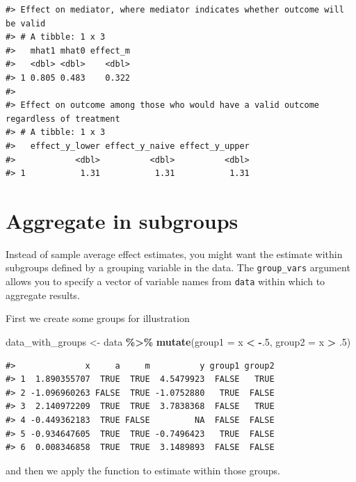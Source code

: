 \documentclass[
]{book}
\newenvironment{Shaded}{\begin{snugshade}}{\end{snugshade}}
\newcommand{\AttributeTok}[1]{\textcolor[rgb]{0.13,0.29,0.53}{#1}}
\newcommand{\DecValTok}[1]{\textcolor[rgb]{0.00,0.00,0.81}{#1}}
\newcommand{\FunctionTok}[1]{\textcolor[rgb]{0.13,0.29,0.53}{\textbf{#1}}}
\newcommand{\NormalTok}[1]{#1}
\newcommand{\OtherTok}[1]{\textcolor[rgb]{0.56,0.35,0.01}{#1}}
\newcommand{\SpecialCharTok}[1]{\textcolor[rgb]{0.81,0.36,0.00}{\textbf{#1}}}
\begin{document}
\begin{verbatim}
#> Effect on mediator, where mediator indicates whether outcome will be valid
#> # A tibble: 1 x 3
#>   mhat1 mhat0 effect_m
#>   <dbl> <dbl>    <dbl>
#> 1 0.805 0.483    0.322
#> 
#> Effect on outcome among those who would have a valid outcome regardless of treatment
#> # A tibble: 1 x 3
#>   effect_y_lower effect_y_naive effect_y_upper
#>            <dbl>          <dbl>          <dbl>
#> 1           1.31           1.31           1.31
\end{verbatim}

\hypertarget{aggregate-in-subgroups}{%
\section{Aggregate in subgroups}\label{aggregate-in-subgroups}}

Instead of sample average effect estimates, you might want the estimate within subgroups defined by a grouping variable in the data. The \texttt{group\_vars} argument allows you to specify a vector of variable names from \texttt{data} within which to aggregate results.

First we create some groups for illustration

\begin{Shaded}
\begin{Highlighting}[]
\NormalTok{data\_with\_groups }\OtherTok{\textless{}{-}}\NormalTok{ data }\SpecialCharTok{\%\textgreater{}\%}
  \FunctionTok{mutate}\NormalTok{(}\AttributeTok{group1 =}\NormalTok{ x }\SpecialCharTok{\textless{}} \SpecialCharTok{{-}}\NormalTok{.}\DecValTok{5}\NormalTok{,}
         \AttributeTok{group2 =}\NormalTok{ x }\SpecialCharTok{\textgreater{}}\NormalTok{ .}\DecValTok{5}\NormalTok{)}
\end{Highlighting}
\end{Shaded}

\begin{verbatim}
#>              x     a     m          y group1 group2
#> 1  1.890355707  TRUE  TRUE  4.5479923  FALSE   TRUE
#> 2 -1.096960263 FALSE  TRUE -1.0752880   TRUE  FALSE
#> 3  2.140972209  TRUE  TRUE  3.7838368  FALSE   TRUE
#> 4 -0.449362183  TRUE FALSE         NA  FALSE  FALSE
#> 5 -0.934647605  TRUE  TRUE -0.7496423   TRUE  FALSE
#> 6  0.008346858  TRUE  TRUE  3.1489893  FALSE  FALSE
\end{verbatim}

and then we apply the function to estimate within those groups.
\end{document}

